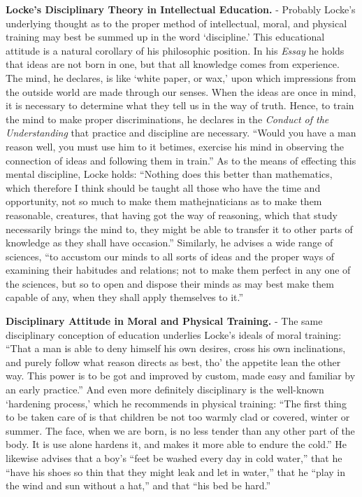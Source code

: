 \documentclass[
]{book}
\begin{document}
\textbf{Locke's Disciplinary Theory in Intellectual Education.} - Probably Locke's underlying thought as to the proper method of intellectual, moral, and physical training may best be summed up in the word `discipline.' This educational attitude is a natural corollary of his philosophic position. In his \emph{Essay} he holds that ideas are not born in one, but that all knowledge comes from experience. The mind, he declares, is like `white paper, or wax,' upon which impressions from the outside world are made through our senses. When the ideas are once in mind, it is necessary to determine what they tell us in the way of truth. Hence, to train the mind to make proper discriminations, he declares in the \emph{Conduct of the Understanding} that practice and discipline are necessary. ``Would you have a man reason well, you must use him to it betimes, exercise his mind in observing the connection of ideas and following them in train.'' As to the means of effecting this mental discipline, Locke holds: ``Nothing does this better than mathematics, which therefore I think should be taught all those who have the time and opportunity, not so much to make them mathejnaticians as to make them reasonable, creatures, that having got the way of reasoning, which that study necessarily brings the mind to, they might be able to transfer it to other parts of knowledge as they shall have occasion.'' Similarly, he advises a wide range of sciences, ``to accustom our minds to all sorts of ideas and the proper ways of examining their habitudes and relations; not to make them perfect in any one of the sciences, but so to open and dispose their minds as may best make them capable of any, when they shall apply themselves to it.''

\textbf{Disciplinary Attitude in Moral and Physical Training.} - The same disciplinary conception of education underlies Locke's ideals of moral training: ``That a man is able to deny himself his own desires, cross his own inclinations, and purely follow what reason directs as best, tho' the appetite lean the other way. This power is to be got and improved by custom, made easy and familiar by an early practice.'' And even more definitely disciplinary is the well-known `hardening process,' which he recommends in physical training: ``The first thing to be taken care of is that children be not too warmly clad or covered, winter or summer. The face, when we are born, is no less tender than any other part of the body. It is use alone hardens it, and makes it more able to endure the cold.'' He likewise advises that a boy's ``feet be washed every day in cold water,'' that he ``have his shoes so thin that they might leak and let in water,'' that he ``play in the wind and sun without a hat,'' and that ``his bed be hard.''
\end{document}
